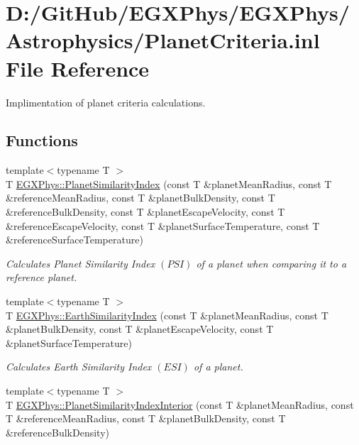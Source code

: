 \hypertarget{_planet_criteria_8inl}{}\section{D\+:/\+Git\+Hub/\+E\+G\+X\+Phys/\+E\+G\+X\+Phys/\+Astrophysics/\+Planet\+Criteria.inl File Reference}
\label{_planet_criteria_8inl}


Implimentation of planet criteria calculations.  


\subsection*{Functions}
\begin{DoxyCompactItemize}
\item 
{\footnotesize template$<$typename T $>$ }\\T \mbox{\hyperlink{group___e_g_x_phys-_planet_criteria_ga62e8b781c301df60bd04af3183a965eb}{E\+G\+X\+Phys\+::\+Planet\+Similarity\+Index}} (const T \&planet\+Mean\+Radius, const T \&reference\+Mean\+Radius, const T \&planet\+Bulk\+Density, const T \&reference\+Bulk\+Density, const T \&planet\+Escape\+Velocity, const T \&reference\+Escape\+Velocity, const T \&planet\+Surface\+Temperature, const T \&reference\+Surface\+Temperature)
\begin{DoxyCompactList}\small\item\em Calculates Planet Similarity Index $(PSI)$ of a planet when comparing it to a reference planet. \end{DoxyCompactList}\item 
{\footnotesize template$<$typename T $>$ }\\T \mbox{\hyperlink{group___e_g_x_phys-_planet_criteria_ga4b86397b1c839c49ac599d49fda207d4}{E\+G\+X\+Phys\+::\+Earth\+Similarity\+Index}} (const T \&planet\+Mean\+Radius, const T \&planet\+Bulk\+Density, const T \&planet\+Escape\+Velocity, const T \&planet\+Surface\+Temperature)
\begin{DoxyCompactList}\small\item\em Calculates Earth Similarity Index $(ESI)$ of a planet. \end{DoxyCompactList}\item 
{\footnotesize template$<$typename T $>$ }\\T \mbox{\hyperlink{group___e_g_x_phys-_planet_criteria_ga6dc06a1a8baf6e132abed51fcf410c7f}{E\+G\+X\+Phys\+::\+Planet\+Similarity\+Index\+Interior}} (const T \&planet\+Mean\+Radius, const T \&reference\+Mean\+Radius, const T \&planet\+Bulk\+Density, const T \&reference\+Bulk\+Density)

\end{DoxyCompactItemize}
